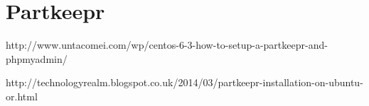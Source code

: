 \chapter{Partkeepr}
\label{chp:partkeepr}

http://www.untacomei.com/wp/centos-6-3-how-to-setup-a-partkeepr-and-phpmyadmin/

http://technologyrealm.blogspot.co.uk/2014/03/partkeepr-installation-on-ubuntu-or.html
